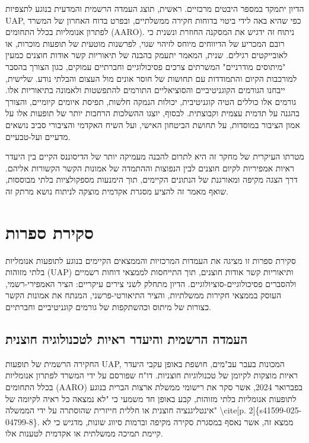 \documentclass[12pt,a4paper]{article}
\begin{document}
הדיון יתמקד במספר היבטים מרכזיים. ראשית, תוצג העמדה הרשמית והמדעית בנוגע לתצפיות UAP, כפי שהיא באה לידי ביטוי בדוחות חקירה ממשלתיים, ובפרט בדוח האחרון של המשרד לפתרון אנומליות בכלל התחומים (AARO). ניתוח זה ידגיש את המסקנה החוזרת ונשנית כי רובם המכריע של הדיווחים מיוחס לזיהוי שגוי, לפרשנות מוטעית של תופעות מוכרות, או לאובייקטים רגילים. שנית, המאמר יתעמק בהבנה של תיאוריות קשר אודות חוצנים כמעין "מיתוסים מודרניים" המשרתים צרכים פסיכולוגיים וחברתיים עמוקים, כגון הצורך בהסבר למורכבות הקיום והתמודדות עם תחושות של חוסר אונים מול העצום והבלתי נודע. שלישית, ייבחנו הגורמים הקוגניטיביים והסוציאליים התורמים להתפשטות ולאמונה בתיאוריות אלו. גורמים אלו כוללים הטיה קוגניטיבית, יכולות הנמקה חלשות, תפיסת איומים קיומיים, והצורך בהגנה על תדמית עצמית וקבוצתית. לבסוף, יוצגו ההשלכות הרחבות יותר של תופעות אלו על אמון הציבור במוסדות, על תחושת הביטחון האישי, ועל השיח האקדמי והציבורי סביב נושאים מדעיים ועל-טבעיים.

מטרתו העיקרית של מחקר זה היא לתרום להבנה מעמיקה יותר של הדיסוננס הקיים בין היעדר ראיות אמפיריות לקיום חוצנים לבין הנפוצות וההתמדה של אמונות הקשר הקשורות אליהם. דרך הצגה מקיפה ומאורגנת של הנתונים הקיימים, תוך הימנעות מספקולציות בלתי מבוססות, שואף מאמר זה להציע מסגרת אקדמית מוצקה לניתוח נושא מרתק זה.

\section{סקירת ספרות}
סקירת ספרות זו מציגה את העמדות המרכזיות והממצאים הקיימים בנוגע לתופעות אנומליות בלתי מזוהות (UAP) ותיאוריות קשר אודות חוצנים, תוך התייחסות לממצאי דוחות רשמיים ולהסברים פסיכולוגיים-סוציולוגיים. הדיון מתחלק לשני צירים עיקריים: הציר האמפירי-רשמי, העוסק בממצאי חקירות ממשלתיות, והציר התיאורטי-פרשני, המנתח את אמונות הקשר כצורות של מיתוס וכהשתקפות של גורמים קוגניטיביים וחברתיים.

\subsection{העמדה הרשמית והיעדר ראיות לטכנולוגיה חוצנית}
החקירה הרשמית של תופעות UAP, המכונות בעבר עב"מים, חושפת באופן עקבי היעדר ראיות מוצקות לקיומן של טכנולוגיות חוצניות. דו"ח שפורסם על ידי המשרד לפתרון אנומליות בכלל התחומים (AARO) בפברואר 2024, אשר סקר את רישומי ממשלת ארצות הברית בנוגע לתופעות אנומליות בלתי מזוהות, קבע באופן חד משמעי כי "לא נמצאה כל ראיה לקיומה של אינטליגנציה חוצנית או חללית חייזרית שהוסתרה על ידי הממשלה" \textbackslash{}cite[p. 2]\{s41599-025-04799-8\}. ממצא זה, אשר נאסף במסגרת סקירה מקיפה וברמות סיווג שונות, מדגיש כי לא קיימת תמיכה ממשלתית או אקדמית לטענות אלו.
\end{document}
